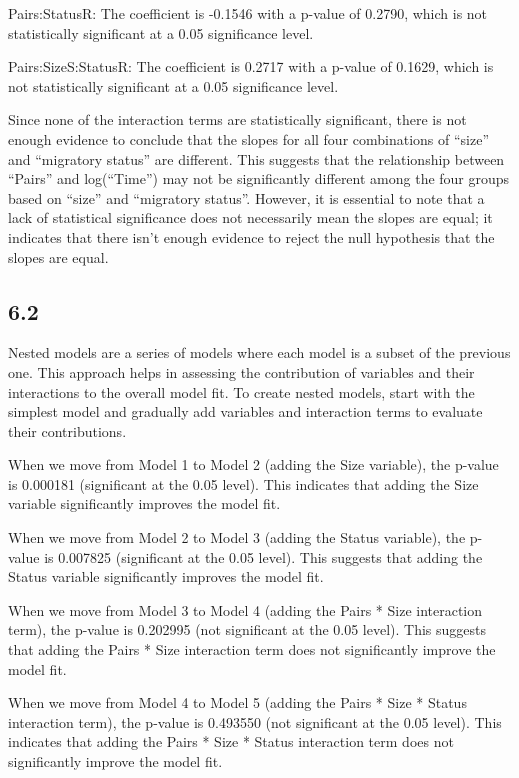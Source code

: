 \documentclass{article}
\begin{document}
Pairs:StatusR: The coefficient is -0.1546 with a p-value of 0.2790, which is not statistically significant at a 0.05 significance level.

Pairs:SizeS:StatusR: The coefficient is 0.2717 with a p-value of 0.1629, which is not statistically significant at a 0.05 significance level.

Since none of the interaction terms are statistically significant, there is not enough evidence to conclude that the slopes for all four combinations of “size” and “migratory status” are different. This suggests that the relationship between “Pairs” and log(“Time”) may not be significantly different among the four groups based on “size” and “migratory status”. However, it is essential to note that a lack of statistical significance does not necessarily mean the slopes are equal; it indicates that there isn’t enough evidence to reject the null hypothesis that the slopes are equal.

\subsection*{6.2}
Nested models are a series of models where each model is a subset of the previous one. This approach helps in assessing the contribution of variables and their interactions to the overall model fit. To create nested models, start with the simplest model and gradually add variables and interaction terms to evaluate their contributions.


When we move from Model 1 to Model 2 (adding the Size variable), the p-value is 0.000181 (significant at the 0.05 level). This indicates that adding the Size variable significantly improves the model fit.

When we move from Model 2 to Model 3 (adding the Status variable), the p-value is 0.007825 (significant at the 0.05 level). This suggests that adding the Status variable significantly improves the model fit.

When we move from Model 3 to Model 4 (adding the Pairs * Size interaction term), the p-value is 0.202995 (not significant at the 0.05 level). This suggests that adding the Pairs * Size interaction term does not significantly improve the model fit.

When we move from Model 4 to Model 5 (adding the Pairs * Size * Status interaction term), the p-value is 0.493550 (not significant at the 0.05 level). This indicates that adding the Pairs * Size * Status interaction term does not significantly improve the model fit.
\end{document}
